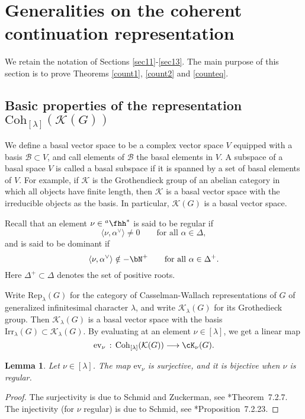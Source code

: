 \documentclass[12pt,a4paper]{amsart}
\newcommand{\CK}{{\mathcal {K}}}
\newcommand{\la}{\langle}
\newcommand{\ra}{\rangle}
\numberwithin{equation}{section}
\newtheorem{lem}[thm]{Lemma}
\theoremstyle{remark}
\def\Irr{\mathrm{Irr}}
\def\hha{{}^a\fhh}
\def\Coh{\mathrm{Coh}}
\newcommand{\Lam}{{[\lambda]}}
\newcommand{\Grt}{\cK}
\begin{document}
\section{Generalities on the coherent continuation representation}
\label{sec:pfGeneral}
 We retain the notation of Sections \ref{sec11}-\ref{sec13}. The main purpose of this section is to prove Theorems \ref{count1}, \ref{count2} and \ref{counteq}.

\subsection{Basic properties of the representation $\Coh_{[\lambda]}(\CK(G))$}

We define a basal vector space to be a complex vector space $V$ equipped with a basis $\mathcal B\subset V$, and call elements of $\mathcal B$ the basal elements in $V$. A subspace of a basal space $V$ is called a basal subspace if it is spanned by a set of basal elements of $V$. For example, if $\CK$ is the Grothendieck group of an abelian category in which all objects have finite length, then $\CK$ is a basal vector space with the irreducible objects as the basis. In particular, $\CK(G)$ is a basal vector space.


Recall that an element $\nu\in \hha^*$ is said to be regular if
\[
    \la \nu, \alpha^\vee\ra\neq 0 \qquad\textrm{for all $\alpha\in \Delta$},
  \]
  and is said to be dominant if
\[
    \la \nu, \alpha^\vee\ra\notin -\bN^+ \qquad\textrm{for all $\alpha\in \Delta^+$}.
  \]
Here $ \Delta^+\subset \Delta$ denotes the set of positive roots.


Write $\mathrm{Rep}_\lambda(G)$ for the category of Casselman-Wallach representations of $G$ of generalized infinitesimal character $\lambda$, and write   $\CK_{\lambda}(G)$ for its  Grothedieck group. Then   $\CK_{\lambda}(G)$  is a basal vector space with the basis $\Irr_\lambda(G)\subset \CK_{\lambda}(G)$.
By evaluating at an element  $\nu\in \Lam$, we get  a linear map
   \[
    \mathrm{ev}_{\nu } \, :\,  \Coh_{[\lambda]}(\CK(G)) \longrightarrow \Grt_{\nu}(G).
  \]



 \begin{lem}\label{lem21}
Let  $\nu\in \Lam$. The map  $\mathrm{ev}_{\nu}$ is surjective, and it is bijective when $\nu$ is regular.
     \end{lem}
\begin{proof}
The surjectivity is due to Schmid and Zuckerman, see  \cite{Vg}*{Theorem~7.2.7}. The injectivity (for $\nu$ regular)  is due to Schmid, see \cite{Vg}*{Proposition~7.2.23}.
\end{proof}
\end{document}
